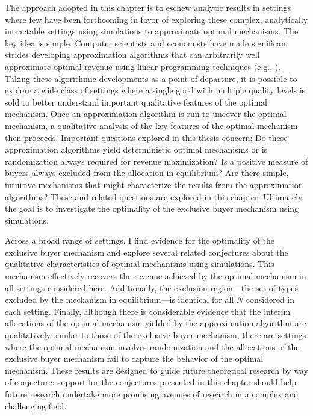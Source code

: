 The approach adopted in this chapter is to eschew analytic results in settings where few have been forthcoming in favor of exploring these complex, analytically intractable settings using simulations to approximate optimal mechanisms. The key idea is simple. Computer scientists and economists have made significant strides developing approximation algorithms that can arbitrarily well approximate optimal revenue using linear programming techniques (e.g., \cite{cai2012,belloni2010multidimensional}). Taking these algorithmic developments as a point of departure, it is possible to explore a wide class of settings where a single good with multiple quality levels is sold to better understand important qualitative features of the optimal mechanism. Once an approximation algorithm is run to uncover the optimal mechanism, a qualitative analysis of the key features of the optimal mechanism then proceeds. Important questions explored in this thesis concern: Do these approximation algorithms yield deterministic optimal mechanisms or is randomization always required for revenue maximization? Is a positive measure of buyers always excluded from the allocation in equilibrium? Are there simple, intuitive mechanisms that might characterize the results from the approximation algorithms? These and related questions are explored in this chapter. Ultimately, the goal is to investigate the optimality of the exclusive buyer mechanism using simulations.


Across a broad range of settings, I find evidence for the optimality of the exclusive buyer mechanism and explore several related conjectures about the qualitative characteristics of optimal mechanisms using simulations. This mechanism effectively recovers the revenue achieved by the optimal mechanism in all settings considered here. Additionally, the exclusion region---the set of types excluded by the mechanism in equilibrium---is identical for all $N$ considered in each setting. Finally, although there is considerable evidence that the interim allocations of the optimal mechanism yielded by the approximation algorithm are qualitatively similar to those of the exclusive buyer mechanism, there are settings where the optimal mechanism involves randomization and the allocations of the exclusive buyer mechanism fail to capture the behavior of the optimal mechanism. These results are designed to guide future theoretical research by way of conjecture: support for the conjectures presented in this chapter should help future research undertake more promising avenues of research in a complex and challenging field.

